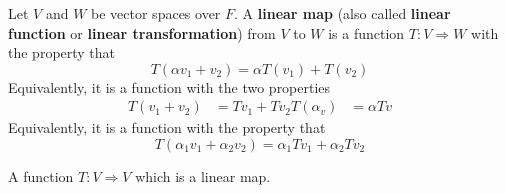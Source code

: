 \begin{definition}
  Let $V$ and $W$ be vector spaces over $F$. A \textbf{linear map} (also called \textbf{linear function} or \textbf{linear transformation}) from $V$ to $W$ is a function $T : V \Rightarrow W$ with the property that
  \[
    T(\alpha v_1 + v_2) = \alpha T(v_1) + T(v_2)
  \]
  Equivalently, it is a function with the two properties
  \begin{align*}
    T(v_1 + v_2) &= Tv_1 + Tv_2
    T(\alpha_v) &= \alpha Tv
  \end{align*}
  Equivalently, it is a function with the property that
  \[
    T(\alpha_1 v_1 + \alpha_2 v_2) = \alpha_1 T v_1 + \alpha_2 T v_2
  \]
\end{definition}

\begin{definition} A function $T : V \Rightarrow V$ which is a linear map.
\end{definition}


